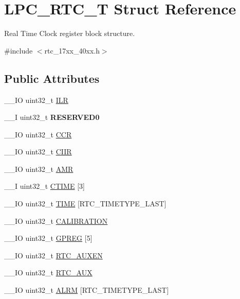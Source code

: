 \hypertarget{struct_l_p_c___r_t_c___t}{\section{L\+P\+C\+\_\+\+R\+T\+C\+\_\+\+T Struct Reference}
\label{struct_l_p_c___r_t_c___t}
}


Real Time Clock register block structure.  




{\ttfamily \#include $<$rtc\+\_\+17xx\+\_\+40xx.\+h$>$}

\subsection*{Public Attributes}
\begin{DoxyCompactItemize}
\item 
\+\_\+\+\_\+\+I\+O uint32\+\_\+t \hyperlink{struct_l_p_c___r_t_c___t_a6e1debaa7074a0fae4767a70f9abff29}{I\+L\+R}
\item 
\hypertarget{struct_l_p_c___r_t_c___t_a94d0c8bf3402d34aac9170bac01bb4fb}{\+\_\+\+\_\+\+I uint32\+\_\+t {\bfseries R\+E\+S\+E\+R\+V\+E\+D0}}\label{struct_l_p_c___r_t_c___t_a94d0c8bf3402d34aac9170bac01bb4fb}

\item 
\+\_\+\+\_\+\+I\+O uint32\+\_\+t \hyperlink{struct_l_p_c___r_t_c___t_ab2117371a628879dbc56f2c1774207b5}{C\+C\+R}
\item 
\+\_\+\+\_\+\+I\+O uint32\+\_\+t \hyperlink{struct_l_p_c___r_t_c___t_ac9d2627afcf203dccde2675c6c74d673}{C\+I\+I\+R}
\item 
\+\_\+\+\_\+\+I\+O uint32\+\_\+t \hyperlink{struct_l_p_c___r_t_c___t_af8b21ae5aa8bedcb0a1dd918678ee389}{A\+M\+R}
\item 
\+\_\+\+\_\+\+I uint32\+\_\+t \hyperlink{struct_l_p_c___r_t_c___t_a66b166ccd4abefe149e6e3ef6d833554}{C\+T\+I\+M\+E} \mbox{[}3\mbox{]}
\item 
\+\_\+\+\_\+\+I\+O uint32\+\_\+t \hyperlink{struct_l_p_c___r_t_c___t_adb4fbf67e8231188ed424c3ce226919e}{T\+I\+M\+E} \mbox{[}R\+T\+C\+\_\+\+T\+I\+M\+E\+T\+Y\+P\+E\+\_\+\+L\+A\+S\+T\mbox{]}
\item 
\+\_\+\+\_\+\+I\+O uint32\+\_\+t \hyperlink{struct_l_p_c___r_t_c___t_ade5b98ca9e6ea8af2fd91e8a4f20503b}{C\+A\+L\+I\+B\+R\+A\+T\+I\+O\+N}
\item 
\+\_\+\+\_\+\+I\+O uint32\+\_\+t \hyperlink{struct_l_p_c___r_t_c___t_a6624a04c6db73e0f9e53a9bc3cf50c1a}{G\+P\+R\+E\+G} \mbox{[}5\mbox{]}
\item 
\+\_\+\+\_\+\+I\+O uint32\+\_\+t \hyperlink{struct_l_p_c___r_t_c___t_af65651a26ceb3d710ccdba8f762a649f}{R\+T\+C\+\_\+\+A\+U\+X\+E\+N}
\item 
\+\_\+\+\_\+\+I\+O uint32\+\_\+t \hyperlink{struct_l_p_c___r_t_c___t_ab476d508c9ea87e71724c30d36ece294}{R\+T\+C\+\_\+\+A\+U\+X}
\item 
\+\_\+\+\_\+\+I\+O uint32\+\_\+t \hyperlink{struct_l_p_c___r_t_c___t_abeb0bd5d52ee9f40f515b9b007c7a832}{A\+L\+R\+M} \mbox{[}R\+T\+C\+\_\+\+T\+I\+M\+E\+T\+Y\+P\+E\+\_\+\+L\+A\+S\+T\mbox{]}
\end{DoxyCompactItemize}


